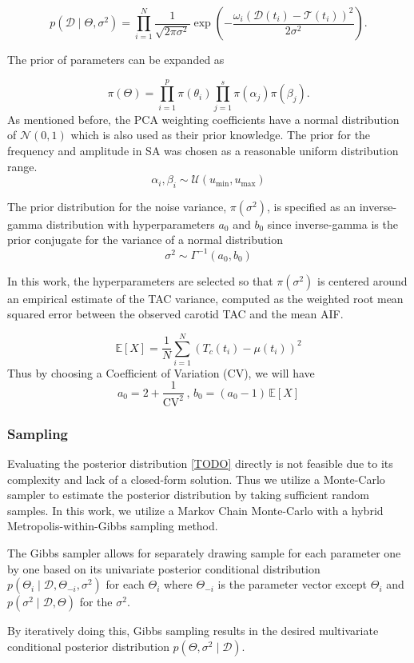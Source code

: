 \[
	p(\mathcal{D} \mid \Theta,\sigma^2) = \prod_{i=1}^N \frac{1}{\sqrt{2\pi \sigma^2}} \exp\left( -\frac{\omega_i(\mathcal{D}(t_i) - \mathcal{T}(t_i))^2}{2\sigma^2} \right).
\]

The prior of parameters can be expanded as

\[
	\pi(\Theta) = \prod_{i=1}^p \pi(\theta_i)  \prod_{j=1}^s \pi(\alpha_j) \pi(\beta_j).
\]
As mentioned before, the PCA weighting coefficients have a normal distribution of $\mathcal{N}(0,1)$ which is also used as their prior knowledge.
The prior for the frequency and amplitude in SA was chosen as a reasonable uniform distribution range.
\[
	\alpha_i,\beta_i \sim \mathcal{U}( u_{\text{min}} , u_{\text{max}} )
\]

The prior distribution for the noise variance, $\pi(\sigma^2)$, is specified as an inverse-gamma distribution with hyperparameters $a_0$ and $b_0$ since inverse-gamma is the prior conjugate for the variance of a normal distribution
\[
	\sigma^2 \sim \Gamma^{-1}(a_0,b_0)
\]

In this work, the hyperparameters are selected so that $\pi(\sigma^2)$ is centered around an empirical estimate of the TAC variance, computed as the weighted root mean squared error between the observed carotid TAC and the mean AIF.

\[
	\mathbb{E}[X] = \frac{1}{N} \sum_{i=1}^{N} (T_c(t_i) - \mu(t_i))^2
\]
Thus by choosing a Coefficient of Variation (CV), we will have
\[
	a_0 = 2 + \frac{1}{\mathrm{CV}^2}\, , \, b_0 = (a_0 - 1) \, \mathbb{E}[X]
\]
\subsubsection{Sampling}

Evaluating the posterior distribution \ref{TODO} directly is not feasible due to its complexity and lack of a closed-form solution.
Thus we utilize a Monte-Carlo sampler to estimate the posterior distribution by taking sufficient random samples.
In this work, we utilize a Markov Chain Monte-Carlo with a hybrid Metropolis-within-Gibbs sampling method.

The Gibbs sampler allows for separately drawing sample for each parameter one by one based on its univariate posterior conditional distribution $p(\Theta_i \mid \mathcal{D}, \Theta_{-i}, \sigma^2)$ for each $\Theta_i$ where $\Theta_{-i}$ is the parameter vector except $\Theta_i$ and $p(\sigma^2 \mid \mathcal{D},\Theta)$ for the $\sigma^2$.

By iteratively doing this, Gibbs sampling results in the desired multivariate conditional posterior distribution $p(\Theta,\sigma^2 \mid \mathcal{D})$.

